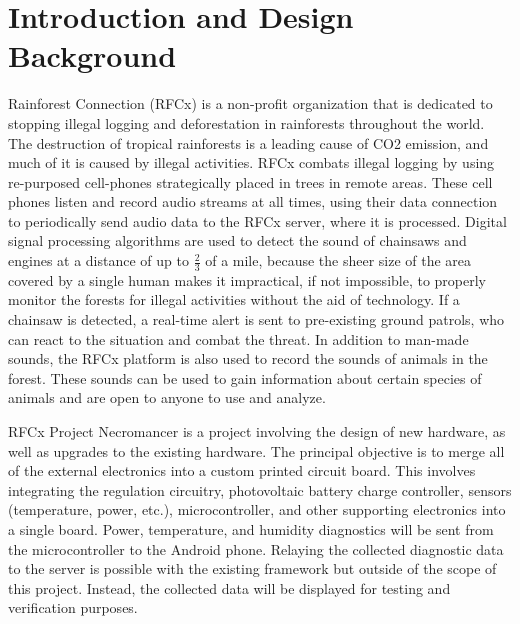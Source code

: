 \documentclass{article}
\newcommand{\ASSNMT}{Project Necromancer}
\begin{document}
{
\pagestyle{fancy}
\fancyhf{}
\lhead{\ASSNMT}
\setlength{\parindent}{0cm}
\newpage
\section{Introduction and Design Background}
Rainforest Connection (RFCx) is a non-profit organization that is dedicated to stopping illegal logging and deforestation in rainforests throughout the world. The destruction of tropical rainforests is a leading cause of CO2 emission, and much of it is caused by illegal activities. RFCx combats illegal logging by using re-purposed cell-phones strategically placed in trees in remote areas. These cell phones listen and record audio streams at all times, using their data connection to periodically send audio data to the RFCx server, where it is processed. Digital signal processing algorithms are used to detect the sound of chainsaws and engines at a distance of up to $\frac{2}{3}$ of a mile, because the sheer size of the area covered by a single human makes it impractical, if not impossible, to properly monitor the forests for illegal activities without the aid of technology. If a chainsaw is detected, a real-time alert is sent to pre-existing ground patrols, who can react to the situation and combat the threat. In addition to man-made sounds, the RFCx platform is also used to record the sounds of animals in the forest. These sounds can be used to gain information about certain species of animals and are open to anyone to use and analyze.

\bigskip
RFCx Project Necromancer is a project involving the design of new hardware, as well as upgrades to the existing hardware. The principal objective is to merge all of the external electronics into a custom printed circuit board. This involves integrating the regulation circuitry, photovoltaic battery charge controller, sensors (temperature, power, etc.), microcontroller, and other supporting electronics into a single board. Power, temperature, and humidity diagnostics will be sent from the microcontroller to the Android phone. Relaying the collected diagnostic data to the server is possible with the existing framework but outside of the scope of this project. Instead, the collected data will be displayed for testing and verification purposes. 

}
\end{document}
